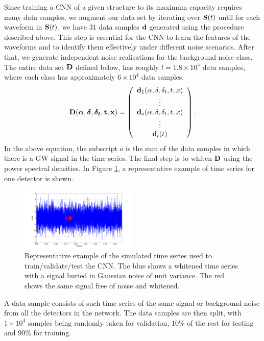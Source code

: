 \documentclass[aps,twocolumn,showpacs,groupedaddress, nofootinbib]{revtex4}  %
\begin{document}
Since training a \ac{CNN} of a given structure to its maximum capacity requires many data samples, we augment our data set by iterating over $\bold{S}(t)$ until 
for each waveform in $\bold{S}(t)$, we have $31$ data samples $\bold{d}$ generated using the procedure described above.
This step is essential for the \ac{CNN} to learn the features of the waveforms and to identify them effectively under different noise scenarios.
After that, we generate independent noise realisations for the background noise class.
The entire data set $\bold{D}$ defined below, has roughly $l = 1.8 \times 10^{5}$ data samples, where each class has approximately $6\times10^{4}$ data samples.
\begin{equation}\label{eq:finaldata}
\bold{D}(\boldsymbol{\alpha}, \boldsymbol{\delta}, \boldsymbol{\delta_t}, \bold{t}, \bold{x}) =  \left(\begin{array}{c}
\bold{d}_1(\alpha, \delta, \delta_t, t, x) \\
\vdots \\
\bold{d}_o(\alpha, \delta, \delta_t, t, x) \\
\vdots \\
\bold{d}_l(t) \\
\end{array}\right).
\end{equation}
In the above equation, the subscript $o$ is the sum of the data samples in which there is a \ac{GW} signal in the time series. 
The final step is to whiten $\bold{D}$ using the power spectral densities.
In Figure \ref{fig:sample}, a representative example  of time series for one detector is shown. 
\begin{figure}
\includegraphics[width=0.5\textwidth]{datasample.png}
\caption{Representative example of the simulated time series used to train/validate/test the \ac{CNN}.
The blue shows a whitened time series with a signal buried in Gaussian noise of unit variance.
The red shows the same signal free of noise and whitened. 
\label{fig:sample}}
\end{figure}
A data sample consists of such time series of the same signal or background noise from all the detectors in the network.
The data samples are then split, with $1\times10^{4}$ samples being randomly taken for validation, $10\%$ of the rest for testing and $90\%$ for training.
\end{document}
